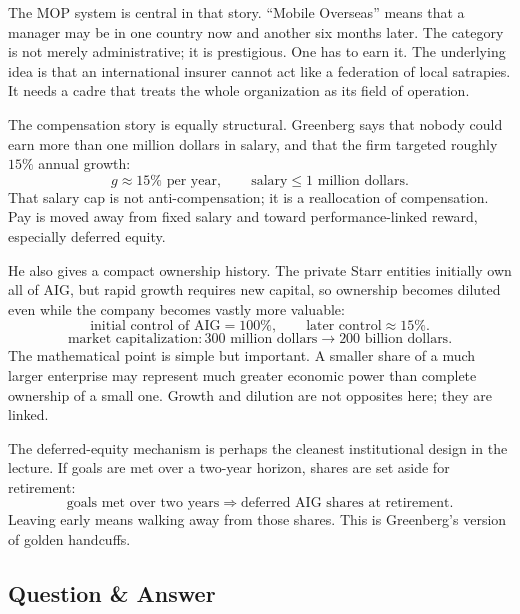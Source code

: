 The MOP system is central in that story. ``Mobile Overseas'' means that a manager may be in one country now and another six months later. The category is not merely administrative; it is prestigious. One has to earn it. The underlying idea is that an international insurer cannot act like a federation of local satrapies. It needs a cadre that treats the whole organization as its field of operation.

The compensation story is equally structural. Greenberg says that nobody could earn more than one million dollars in salary, and that the firm targeted roughly \(15\%\) annual growth:
\begin{equation}
g \approx 15\% \text{ per year},
\qquad
\text{salary} \le 1\text{ million dollars}.
\end{equation}
That salary cap is not anti-compensation; it is a reallocation of compensation. Pay is moved away from fixed salary and toward performance-linked reward, especially deferred equity.

He also gives a compact ownership history. The private Starr entities initially own all of AIG, but rapid growth requires new capital, so ownership becomes diluted even while the company becomes vastly more valuable:
\begin{equation}
\text{initial control of AIG} = 100\%,
\qquad
\text{later control} \approx 15\%.
\end{equation}
\begin{equation}
\text{market capitalization}: 300\text{ million dollars} \to 200\text{ billion dollars}.
\end{equation}
The mathematical point is simple but important. A smaller share of a much larger enterprise may represent much greater economic power than complete ownership of a small one. Growth and dilution are not opposites here; they are linked.

The deferred-equity mechanism is perhaps the cleanest institutional design in the lecture. If goals are met over a two-year horizon, shares are set aside for retirement:
\begin{equation}
\text{goals met over two years}
\Rightarrow
\text{deferred AIG shares at retirement}.
\end{equation}
Leaving early means walking away from those shares. This is Greenberg's version of golden handcuffs.

\subsection{Question \& Answer}

